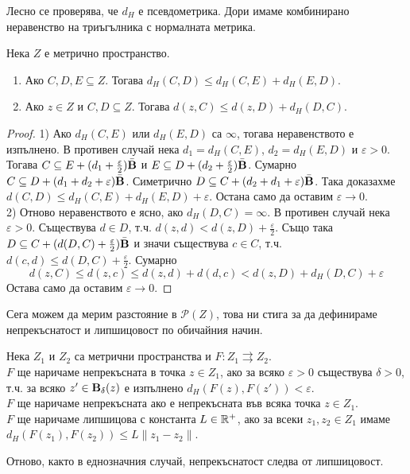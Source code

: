 Лесно се проверява, че $d_H$ е псевдометрика. Дори имаме комбинирано неравенство на триъгълника с нормалната метрика.
\begin{proposition}
    Нека $Z$ е метрично пространство.
    \begin{enumerate}
        \item Ако $C,D,E\subseteq Z$. Тогава $d_H(C,D)\leq d_H(C,E)+d_H(E,D)$.
        \item Ако $z\in Z$ и $C,D\subseteq Z$. Тогава $d(z,C)\leq d(z,D) + d_H(D,C)$.
    \end{enumerate}
\end{proposition}
\begin{proof}
    1) Ако $d_H(C,E)$ или $d_H(E,D)$ са $\infty$, тогава неравенството е изпълнено.
    В противен случай нека $d_1 = d_H(C,E)$, $d_2 = d_H(E,D)$ и $\varepsilon > 0$.
    Тогава $C \subseteq E + (d_1 + \frac{\varepsilon}{2})\bar{\textbf{B}}$ и $E \subseteq D + (d_2 + \frac{\varepsilon}{2})\bar{\textbf{B}}$. Сумарно $C \subseteq D + (d_1 + d_2 + \varepsilon)\bar{\textbf{B}}$.
    Симетрично $D \subseteq C + (d_2 + d_1 + \varepsilon)\bar{\textbf{B}}$. Така доказахме $d(C,D)\leq d_H(C,E) + d_H(E,D) + \varepsilon$. Остана само да оставим $\varepsilon\to 0$.\\
    2) Отново неравенството е ясно, ако $d_H(D,C)=\infty$.
    В противен случай нека $\varepsilon > 0$. Съществува $d\in D$, т.ч. $d(z,d) < d(z,D) + \frac{\varepsilon}{2}$. Също така $D\subseteq C + (d(D,C) + \frac{\varepsilon}{2})\bar{\textbf{B}}$ и значи съществува $c\in C$, т.ч. $d(c, d) \leq d(D,C) + \frac{\varepsilon}{2}$. Сумарно
    \[
        d(z,C) \leq d(z,c) \leq d(z,d) + d(d,c) < d(z,D) + d_H(D,C) + \varepsilon
    \]
    Остава само да оставим $\varepsilon\to 0$.
\end{proof}

Сега можем да мерим разстояние в $\mathcal{P}(Z)$, това ни стига за да дефинираме непрекъснатост и липшицовост по обичайния начин.
\begin{definition}
    Нека $Z_1$ и $Z_2$ са метрични пространства и $F:Z_1 \rightrightarrows Z_2$.\\
    $F$ ще наричаме непрекъсната в точка $z\in Z_1$, ако за всяко $\varepsilon > 0$ съществува $\delta > 0$, т.ч. за всяко $z'\in\textbf{B}_\delta(z)$ е изпълнено $d_H(F(z), F(z')) < \varepsilon$.\\
    $F$ ще наричаме непрекъсната ако е непрекъсната във всяка точка $z\in Z_1$.\\
    $F$ ще наричаме липшицова с константа $L\in\mathbb{R}^+$, ако за всеки $z_1,z_2\in Z_1$ имаме $d_H(F(z_1), F(z_2)) \leq L\|z_1 - z_2\|$.
\end{definition}
Отново, както в еднозначния случай, непрекъснатост следва от липшицовост.


